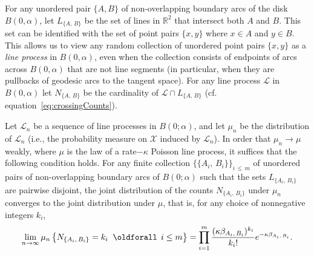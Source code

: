 \documentclass[AHL, Unicode, longabstracts, published]{cedram}
\newcommand{\zz}[1]{\mathbb #1}
\renewcommand*{\forall}{\mathrel{\oldforall}}
\begin{document}
For any unordered pair $\{A,B \}$ of non-overlapping boundary arcs of the disk $B (0,\alpha)$, let $L_{\{A,\,B \}}$ be the set of lines in $\zz{R}^{2}$ that intersect both $A$ and $B$. This set can be identified with the set of point pairs $\{x,y \}$ where $x\in A$ and $y\in B$. This allows us to view any random collection of unordered point pairs $\{x,y \}$ as a \emph{line process} in $B (0,\alpha)$, even when the collection consists of endpoints of arcs across $B (0,\alpha)$ that are not line segments (in particular, when they are pullbacks of geodesic arcs to the tangent space). For any line process $\mathcal{L}$ in $B (0,\alpha)$ let $N_{\{A,\,B \}}$ be the cardinality of $\mathcal{L}\cap L_{\{A,\,B \}}$ (cf. equation~\eqref{eq:crossingCounts}).

\begin{prop}\label{proposition:sufficientCondition}
Let $\mathcal{L}_{n}$ be a sequence of line processes in $B (0;\alpha)$, and let $\mu_{n}$ be the distribution of $\mathcal{L}_{n}$ (i.e., the probability measure on $\mathcal{X}$ induced by $\mathcal{L}_{n}$). In order that $\mu_{n}\rightarrow \mu$ weakly, where $\mu$ is the law of a rate$-\kappa$ Poisson line process, it suffices that the following condition holds. For any finite collection $\{\{ A_{i},\,B_{i}\} \}_{i\,\leq\,m}$ of unordered pairs of non-overlapping boundary arcs of $B(0;\alpha)$ such that the sets $L_{\{A_{i},\,B_{i} \}}$ are pairwise disjoint, the joint distribution of the counts $N_{\{ A_{i},\,B_{i}\}}$ under $\mu_{n}$ converges to the joint distribution under $\mu$, that is, for any choice of nonnegative integers $k_{i}$,
\begin{equation}\label{eq:suff-weak-convergence}
\lim_{n \rightarrow \infty} \mu_{n}\left\{N_{\{A_{i},\,B_{i} \}}=k_{i} \; \forall \,i\leq m\right\} =\prod_{i=1}^{m}
\frac{(\kappa \beta_{A_{i},\,B_{i}})^{k_{i}}}{k_{i}!} e^{-\kappa \beta_{A_{i},\,B_{i}}}.
\end{equation}
\end{prop}
\end{document}
